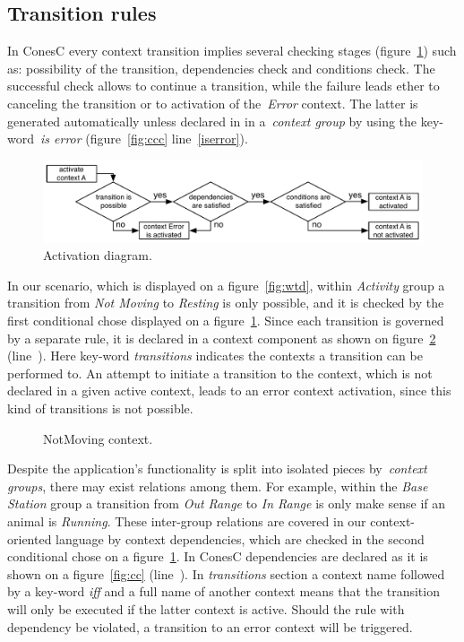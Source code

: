 \subsection{Transition rules}\label{subsec:rules}

In ConesC every context transition implies several checking stages (figure~\ref{fig:ad}) such as:
possibility of the transition, dependencies check and conditions check. The successful check allows
to continue a transition, while the failure leads ether to canceling the transition or to
activation of the~\emph{Error} context. The latter is generated automatically unless declared in
in a~\emph{context group} by using the key-word~\emph{is error} (figure~\ref{fig:ccc}
line~\ref{iserror}).

\begin{figure}[!h]
\centering
\includegraphics[width=\columnwidth]{pdf/activation_diagram}
\caption{Activation diagram.}
\label{fig:ad}
\end{figure}

In our scenario, which is displayed on a figure~\ref{fig:wtd}, within \emph{Activity} group a
transition from \emph{Not Moving} to \emph{Resting} is only possible, and it is checked
by the first conditional chose displayed on a figure~\ref{fig:ad}.
Since each transition is governed by a separate rule, it is declared in a context component as shown
on figure~\ref{fig:nmc} (line~). Here key-word \emph{transitions} indicates the
contexts a transition can be performed to. An attempt to initiate
a transition to the context, which is not declared in a given active context, leads to an error context
activation, since this kind of transitions is not possible.


\begin{figure}[!h]
\TheSbox
\caption{NotMoving context.}
\label{fig:nmc}
\end{figure}

Despite the application's  functionality is split into isolated pieces by~\emph{context groups},
there may exist relations among them. For example, within the 
\emph{Base Station} group a transition from \emph{Out Range} to \emph{In Range} is only
make sense if an animal is \emph{Running}. These inter-group relations are covered in our
context-oriented language by context dependencies, which are checked in the second
conditional chose on a figure~\ref{fig:ad}. In ConesC dependencies are declared as it is shown on a
figure~\ref{fig:cc} (line~). In \emph{transitions} section a context name
followed by a key-word \emph{iff} and a full name of another context means that
the transition will only be executed if the latter context is active. Should the rule with dependency
be violated, a transition to an error context will be triggered.

